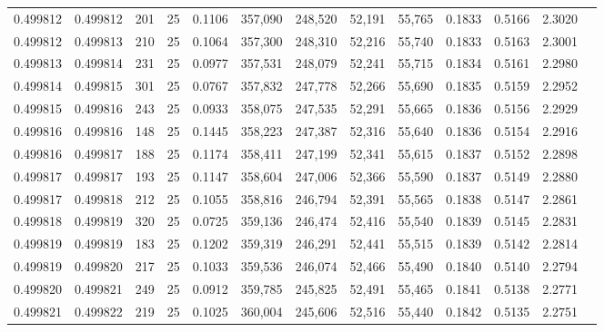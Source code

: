 \begin{tabular}{rrrrrrrrrrrrr}
0.499812 & 0.499812 & 201 &  25 &                                     0.1106 & 357,090 & 248,520 &  52,191 &  55,765 & 0.1833 & 0.5166 & 2.3020 \\
0.499812 & 0.499813 & 210 &  25 &                                     0.1064 & 357,300 & 248,310 &  52,216 &  55,740 & 0.1833 & 0.5163 & 2.3001 \\
0.499813 & 0.499814 & 231 &  25 &                                     0.0977 & 357,531 & 248,079 &  52,241 &  55,715 & 0.1834 & 0.5161 & 2.2980 \\
0.499814 & 0.499815 & 301 &  25 &                                     0.0767 & 357,832 & 247,778 &  52,266 &  55,690 & 0.1835 & 0.5159 & 2.2952 \\
0.499815 & 0.499816 & 243 &  25 &                                     0.0933 & 358,075 & 247,535 &  52,291 &  55,665 & 0.1836 & 0.5156 & 2.2929 \\
0.499816 & 0.499816 & 148 &  25 &                                     0.1445 & 358,223 & 247,387 &  52,316 &  55,640 & 0.1836 & 0.5154 & 2.2916 \\
0.499816 & 0.499817 & 188 &  25 &                                     0.1174 & 358,411 & 247,199 &  52,341 &  55,615 & 0.1837 & 0.5152 & 2.2898 \\
0.499817 & 0.499817 & 193 &  25 &                                     0.1147 & 358,604 & 247,006 &  52,366 &  55,590 & 0.1837 & 0.5149 & 2.2880 \\
0.499817 & 0.499818 & 212 &  25 &                                     0.1055 & 358,816 & 246,794 &  52,391 &  55,565 & 0.1838 & 0.5147 & 2.2861 \\
0.499818 & 0.499819 & 320 &  25 &                                     0.0725 & 359,136 & 246,474 &  52,416 &  55,540 & 0.1839 & 0.5145 & 2.2831 \\
0.499819 & 0.499819 & 183 &  25 &                                     0.1202 & 359,319 & 246,291 &  52,441 &  55,515 & 0.1839 & 0.5142 & 2.2814 \\
0.499819 & 0.499820 & 217 &  25 &                                     0.1033 & 359,536 & 246,074 &  52,466 &  55,490 & 0.1840 & 0.5140 & 2.2794 \\
0.499820 & 0.499821 & 249 &  25 &                                     0.0912 & 359,785 & 245,825 &  52,491 &  55,465 & 0.1841 & 0.5138 & 2.2771 \\
0.499821 & 0.499822 & 219 &  25 &                                     0.1025 & 360,004 & 245,606 &  52,516 &  55,440 & 0.1842 & 0.5135 & 2.2751 \\

\end{tabular}
